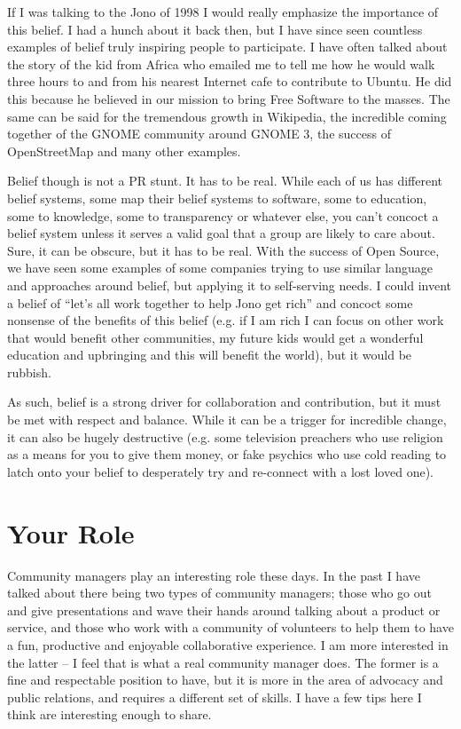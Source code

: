 If I was talking to the Jono of 1998 I would really emphasize the importance of this belief. I had a hunch about it back then, but I have since seen countless examples of belief truly inspiring people to participate. I have often talked about the story of the kid from Africa who emailed me to tell me how he would walk three hours to and from his nearest Internet cafe to contribute to Ubuntu. He did this because he believed in our mission to bring Free Software to the masses. The same can be said for the tremendous growth in Wikipedia, the incredible coming together of the GNOME community around GNOME 3, the success of OpenStreetMap and many other examples.

Belief though is not a PR stunt. It has to be real. While each of us has different belief systems, some map their belief systems to software, some to education, some to knowledge, some to transparency or whatever else, you can’t concoct a belief system unless it serves a valid goal that a group are likely to care about. Sure, it can be obscure, but it has to be real. With the success of Open Source, we have seen some examples of some companies trying to use similar language and approaches around belief, but applying it to self-serving needs. I could invent a belief of “let’s all work together to help Jono get rich” and concoct some nonsense of the benefits of this belief (e.g. if I am rich I can focus on other work that would benefit other communities, my future kids would get a wonderful education and upbringing and this will benefit the world), but it would be rubbish.

As such, belief is a strong driver for collaboration and contribution, but it must be met with respect and balance. While it can be a trigger for incredible change, it can also be hugely destructive (e.g. some television preachers who use religion as a means for you to give them money, or fake psychics who use cold reading to latch onto your belief to desperately try and re-connect with a lost loved one).

\section*{Your Role}

Community managers play an interesting role these days. In the past I have talked about there being two types of community managers; those who go out and give presentations and wave their hands around talking about a product or service, and those who work with a community of volunteers to help them to have a fun, productive and enjoyable collaborative experience. I am more interested in the latter – I feel that is what a real community manager does. The former is a fine and respectable position to have, but it is more in the area of advocacy and public relations, and requires a different set of skills. I have a few tips here I think are interesting enough to share.


